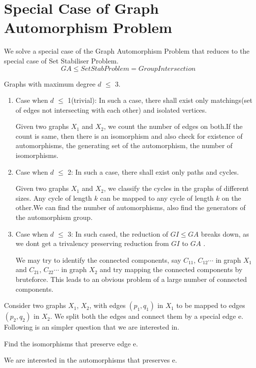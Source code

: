 \section{Special Case of Graph Automorphism Problem}
We solve a special case of the Graph Automorphism Problem that reduces to the special case of Set Stabiliser Problem. 
\[ GA \leqslant SetStab Problem = Group Intersection \]
\begin{definition} Graphs with maximum degree $d$ $\leqslant$ 3.
\end{definition}
\begin{enumerate}
	\item Case when $d$ $\leqslant$ 1(trivial): 
	In such a case, there shall exist only matchings(set of edges not intersecting with each other) and isolated vertices. 
	
	Given two graphs $X_1$ and $X_2$, we count the number of edges on both.If the count is same, then there is an isomorphism and also check for existence of automorphisms, the generating set of the automorphism, the number of isomorphisms.
	\item Case when $d$ $\leqslant$ 2:
	In such a case, there shall exist only paths and cycles.
	
	Given two graphs $X_1$ and $X_2$, we classify the cycles in the graphs of different sizes. Any cycle of length $k$ can be mapped to any cycle of length $k$ on the other.We can find the number of automorphisms, also find the generators of the automorphism group.
	\item Case when $d$ $\leqslant$ 3:
	In such cased, the reduction of $GI \leqslant GA$ breaks down, as we dont get a trivalency preserving reduction from $GI$ to $GA$ .
	
	We may try to identify the connected components, say $C_{11}$, $C_{12}\cdots$ in graph $X_1$ and $C_{21}$, $C_{22} \cdots$ in graph $X_2$ and try mapping the connected components by bruteforce. This leads to an obvious problem of a large number of connected components.	 
\end{enumerate}	



Consider two graphs $X_1$, $X_2$, with edges $(p_1,q_1)$ in $X_1$ to be mapped to edges $(p_2,q_2)$ in $X_2$. We split both the edges and connect them by a special edge e. Following is an simpler question that we are interested in.
\begin{problem} Find the isomorphisms that preserve edge e.
\end{problem}
We are interested in the automorphisms that preserves e. 

